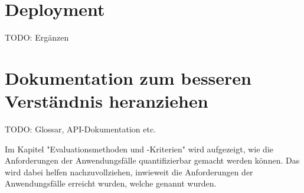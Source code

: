\section{Deployment}
TODO: Ergänzen

\section{Dokumentation zum besseren Verständnis heranziehen}
TODO: Glossar, API-Dokumentation etc.

Im Kapitel "Evaluationsmethoden und -Kriterien" wird aufgezeigt, wie die Anforderungen der Anwendungsfälle quantifizierbar gemacht werden können.
Das wird dabei helfen nachzuvollziehen, inwieweit die Anforderungen der Anwendungsfälle erreicht wurden, welche genannt wurden.
